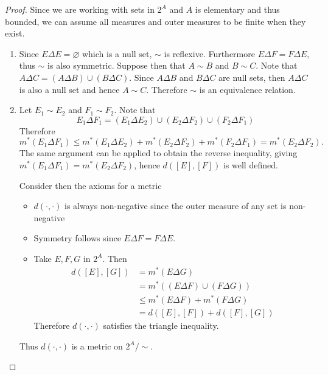 \documentclass[hw_all.tex]{subfiles}
\begin{document}
\begin{proof}
    Since we are working with sets in $2^A$ and $A$ is elementary and thus bounded, we can assume all measures and outer measures to be finite when they exist.

    \begin{enumerate}
        \item
            Since $E \Delta E = \varnothing$ which is a null set, $\sim$ is reflexive. Furthermore $E \Delta F = F \Delta E$, thus $\sim$ is also symmetric. Suppose then that $A \sim B$ and $B \sim C$. Note that $A \Delta C = (A \Delta B) \cup (B \Delta C)$. Since $A \Delta B$ and $B \Delta C$ are null sets, then $A \Delta C$ is also a null set and hence $A \sim C$. Therefore $\sim$ is an equivalence relation.

        \item 
            Let $E_1 \sim E_2$ and $F_1 \sim F_2$. Note that
            \[
                E_1 \Delta F_1 = (E_1 \Delta E_2) \cup (E_2 \Delta F_2) \cup (F_2 \Delta F_1)
            \]
            Therefore
            \[
                m^*(E_1 \Delta F_1) \leq m^*(E_1 \Delta E_2) + m^*(E_2 \Delta F_2) + m^*(F_2 \Delta F_1) = m^*(E_2 \Delta F_2)
            .\]
            The same argument can be applied to obtain the reverse inequality, giving $m^*(E_1 \Delta F_1) = m^*(E_2 \Delta F_2)$, hence $d([E], [F])$ is well defined.

            Consider then the axioms for a metric
            \begin{itemize}
                \item $d(\cdot, \cdot)$ is always non-negative since the outer measure of any set is non-negative
                \item Symmetry follows since $E \Delta F = F \Delta E$.
                \item Take $E, F, G$ in $2^A$. Then
                    \begin{align*}
                        d([E], [G]) &= m^*(E \Delta G) \\
                        &= m^*((E \Delta F) \cup (F \Delta G)) \\
                        &\leq m^*(E \Delta F) + m^*(F \Delta G) \\
                        &= d([E], [F]) + d([F], [G])
                    \end{align*}
                    Therefore $d(\cdot, \cdot)$ satisfies the triangle inequality.
            \end{itemize}
            Thus $d(\cdot, \cdot)$ is a metric on $2^A / \sim$.


\end{enumerate}
\end{proof}
\end{document}
